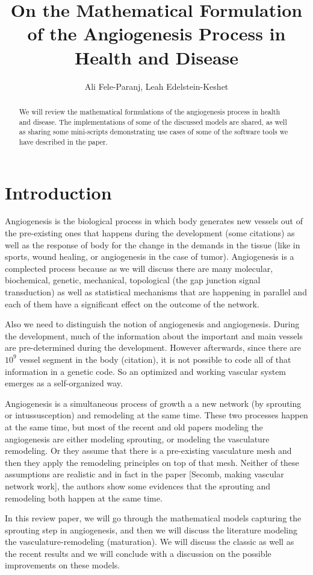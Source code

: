 \documentclass[10pt,a4paper,twocolumn]{article}
\title{On the Mathematical Formulation of the Angiogenesis Process in Health and Disease}
\author{Ali Fele-Paranj, Leah Edelstein-Keshet}
\begin{document}
	\maketitle
	\begin{abstract}
		We will review the mathematical formulations of the angiogenesis process in health and disease. The implementations of some of the discussed models are shared, as well as sharing some mini-scripts demonstrating use cases of some of the software tools we have described in the paper.
	\end{abstract}
	\section{Introduction}
	Angiogenesis is the biological process in which body generates new vessels out of the pre-existing ones that happens during the development (some citations) as well as the response of body for the change in the demands in the tissue (like in sports, wound healing, or angiogenesis in the case of tumor). Angiogenesis is a complected process because as we will discuss there are many molecular, biochemical, genetic, mechanical, topological (the gap junction signal transduction) as well as statistical mechanisms that are happening in parallel and each of them have a significant effect on the outcome of the network. 
	
	Also we need to distinguish the notion of angiogenesis and angiogenesis. During the development, much of the information about the important and main vessels are pre-determined during the development. However afterwards, since there are $10^9$ vessel segment in the body (citation), it is not possible to code all of that information in a genetic code. So an optimized and working vascular system emerges as a self-organized way.
	
	Angiogenesis is a simultaneous process of growth a a new network (by sprouting or intussusception) and remodeling at the same time. These two processes happen at the same time, but most of the recent and old papers modeling the angiogenesis are either modeling sprouting, or modeling the vasculature remodeling. Or they assume that there is a pre-existing vasculature mesh and then they apply the remodeling principles on top of that mesh. Neither of these assumptions are realistic and in fact in the paper [Secomb, making vascular network work], the authors show some evidences that the sprouting and remodeling both happen at the same time.
	
	In this review paper, we will go through the mathematical models capturing the sprouting step in angiogenesis, and then we will discuss the literature modeling the vasculature-remodeling (maturation). We will discuss the classic as well as the recent results and we will conclude with a discussion on the possible improvements on these models.
	
\end{document}
